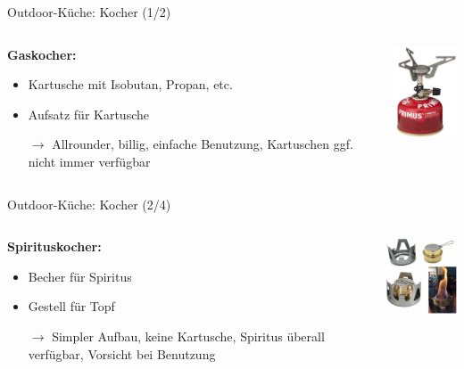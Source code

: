 \documentclass{beamer}
\newcommand{\sarrow}{\small$\rightarrow$}
\begin{document}
			\begin{frame}{Outdoor-Küche: Kocher (1/2)}
				\begin{columns}[c]
					\begin{column}{0.69\textwidth}
						\textbf{Gaskocher:}
						\begin{itemize}
							\item Kartusche mit Isobutan, Propan, etc.
							\item Aufsatz für Kartusche
							\item[\sarrow] Allrounder, billig, einfache Benutzung, Kartuschen ggf. nicht immer verfügbar
						\end{itemize}
					\end{column}
					\begin{column}{0.29\textwidth}
						\includegraphics[width=2.5cm]{images/kocher-gas.png}
					\end{column}
				\end{columns}
			\end{frame}
				
			\begin{frame}{Outdoor-Küche: Kocher (2/4)}
				\begin{columns}[c]
					\begin{column}{0.69\textwidth}
						\textbf{Spirituskocher:}
						\begin{itemize}
							\item Becher für Spiritus
							\item Gestell für Topf
							\item[\sarrow] Simpler Aufbau, keine Kartusche, Spiritus überall verfügbar, Vorsicht bei Benutzung
						\end{itemize}
					\end{column}
					\begin{column}{0.29\textwidth}
						\includegraphics[width=3cm]{images/kocher-spiritus.png}
					\end{column}
				\end{columns}
			\end{frame}
		
\end{document}
